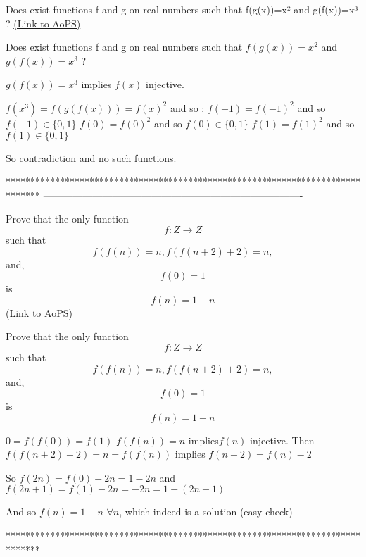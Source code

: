\begin{problem}
	Does exist functions f and g on real numbers such that f(g(x))=x² and g(f(x))=x³ ?
	\flushright \href{https://artofproblemsolving.com/community/c6h587761}{(Link to AoPS)}
\end{problem}



\begin{solution}
	\begin{tcolorbox}Does exist functions f and g on real numbers such that $f(g(x))=x^2$ and $g(f(x))=x^3$ ?\end{tcolorbox}
$g(f(x))=x^3$ implies $f(x)$ injective.

$f(x^3)=f(g(f(x)))=f(x)^2$  and so :
$f(-1)=f(-1)^2$ and so $f(-1)\in\{0,1\}$
$f(0)=f(0)^2$ and so $f(0)\in\{0,1\}$
$f(1)=f(1)^2$ and so $f(1)\in\{0,1\}$

So contradiction and no such functions.
\end{solution}
*******************************************************************************
-------------------------------------------------------------------------------

\begin{problem}
	Prove that the only function \[f:Z\rightarrow Z\]  such that \[f(f(n))=n , f(f(n+2)+2)=n,\] and, \[f(0)=1\] is \[f(n)=1-n\]
	\flushright \href{https://artofproblemsolving.com/community/c6h587763}{(Link to AoPS)}
\end{problem}



\begin{solution}
	\begin{tcolorbox}Prove that the only function \[f:Z\rightarrow Z\]  such that \[f(f(n))=n , f(f(n+2)+2)=n,\] and, \[f(0)=1\] is \[f(n)=1-n\]\end{tcolorbox}
$0=f(f(0))=f(1)$
$f(f(n))=n$ implies$f(n)$ injective.
Then $f(f(n+2)+2)=n=f(f(n))$ implies $f(n+2)=f(n)-2$

So $f(2n)=f(0)-2n=1-2n$ and $f(2n+1)=f(1)-2n=-2n=1-(2n+1)$

And so $f(n)=1-n$ $\forall n$, which indeed is a solution (easy check)
\end{solution}
*******************************************************************************
-------------------------------------------------------------------------------

